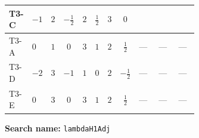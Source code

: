 \documentclass[8pt]{article}
\begin{document}
\begin{landscape}
\begin{longtable}{@{}llcccccc >{\raggedright\arraybackslash}p{0.21\linewidth} >{\raggedright\arraybackslash}p{0.21\linewidth} >{\raggedright\arraybackslash}p{0.21\linewidth}@{}}
\midrule
T3-C & $-1$ & $2$ & $-\frac{1}{2}$ & $2$ & $\frac{1}{2}$ & $3$ & $0$ & \scriptsize\adjustbox{max width=\linewidth}{$\begin{gathered} {\lambda_{H1}^{\rm Adj}} (6 \operatorname{Tr}\!\left({Y_d}\,\left({Y_d}\right)^{\dagger}\right)+2 \operatorname{Tr}\!\left({Y_e}\,\left({Y_e}\right)^{\dagger}\right)+6 \operatorname{Tr}\!\left({Y_u}\,\left({Y_u}\right)^{\dagger}\right))\end{gathered}$} & \scriptsize\adjustbox{max width=\linewidth}{$\begin{gathered} +\frac{64}{3} {\lambda_{H^\dagger H^\dagger S_1^\dagger S_1^\dagger}} \left({\lambda_{H^\dagger H^\dagger S_1^\dagger S_1^\dagger}}\right)^{*}\end{gathered}$} & \scriptsize\adjustbox{max width=\linewidth}{$\begin{gathered} -\frac{4}{3} {\lambda_{S_1 S_1^{\dagger 2}S_2^\dagger}} \left({\lambda_{H H^\dagger S_1^\dagger S_2^\dagger}^{\rm Cross}}\right)^{*}\end{gathered}$} \\
\midrule
T3-A & $0$ & $1$ & $0$ & $3$ & $1$ & $2$ & $\frac{1}{2}$ & --- & --- & --- \\
\midrule
T3-D & $-2$ & $3$ & $-1$ & $1$ & $0$ & $2$ & $-\frac{1}{2}$ & --- & --- & --- \\
\midrule
T3-E & $0$ & $3$ & $0$ & $3$ & $1$ & $2$ & $\frac{1}{2}$ & --- & --- & --- \\
\midrule
\bottomrule
\end{longtable}
\clearpage
\noindent\textbf{Search name: }\texttt{lambdaH1Adj}\par\smallskip

\end{landscape}
\end{document}
